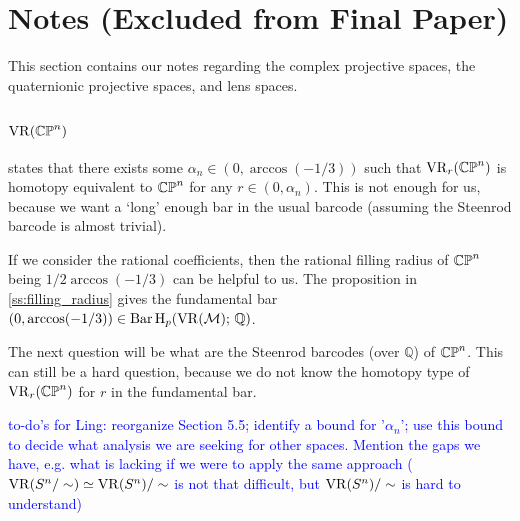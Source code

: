\section{Notes (Excluded from Final Paper)}

This section contains our notes regarding the complex projective spaces, the quaternionic projective spaces, and lens spaces.

\subsection{$\VR(\cp^n)$}

\cite[Corollary 7.10]{lim2020vietoris} states that there exists some $\alpha_n\in (0,\arccos(-1/3))$ such that $\VR_r(\cp^n)$ is homotopy equivalent to $\cp^n$ for any $r\in (0,\alpha_n)$. 
This is not enough for us, because we want a `long' enough bar in the usual barcode (assuming the Steenrod barcode is almost trivial). 

If we consider the rational coefficients, then the rational filling radius of $\cp^n$ being $1/2\arccos(-1/3)$ can be helpful to us. %
The proposition in \cref{ss:filling_radius} gives the fundamental bar  $(0,\arccos(-1/3))\in \Hbarc[\mathbb{Q}]{p}{\cM}$.

The next question will be what are the Steenrod barcodes (over $\mathbb{Q}$) of $\cp^n$. This can still be a hard question, because we do not know the homotopy type of $\VR_r(\cp^n)$ for $r$ in the fundamental bar.

\textcolor{blue}{to-do's for Ling: reorganize Section 5.5; identify a bound for '$\alpha_n$'; use this bound to decide what analysis we are seeking for other spaces. Mention the gaps we have, e.g. what is lacking if we were to apply the same approach ($\VR(S^n/\sim)\simeq \VR(S^n)/\sim$ is not that difficult, but $\VR(S^n)/\sim$ is hard to understand)}
